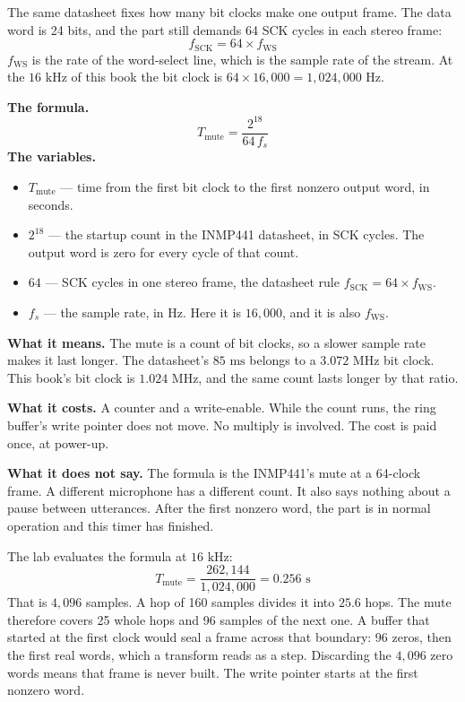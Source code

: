 \documentclass[11pt,a4paper]{article}
\begin{document}
The same datasheet fixes how many bit clocks make one output frame. The data word is 24 bits, and the part still demands 64 SCK cycles in each stereo frame:
\begin{equation*}
f_{\mathrm{SCK}} = 64 \times f_{\mathrm{WS}}
\end{equation*}
$f_{\mathrm{WS}}$ is the rate of the word-select line, which is the sample rate of the stream. At the $16\text{ kHz}$ of this book the bit clock is $64 \times 16{,}000 = 1{,}024{,}000\text{ Hz}$.

\begin{equationcard}
\textbf{The formula.}
\[
T_{\mathrm{mute}} = \frac{2^{18}}{64\, f_s}
\]
\textbf{The variables.}
\begin{itemize}\setlength{\itemsep}{1pt}
    \item $T_{\mathrm{mute}}$ --- time from the first bit clock to the first nonzero output word, in seconds.
    \item $2^{18}$ --- the startup count in the INMP441 datasheet, in SCK cycles. The output word is zero for every cycle of that count.
    \item $64$ --- SCK cycles in one stereo frame, the datasheet rule $f_{\mathrm{SCK}} = 64 \times f_{\mathrm{WS}}$.
    \item $f_s$ --- the sample rate, in Hz. Here it is $16{,}000$, and it is also $f_{\mathrm{WS}}$.
\end{itemize}
\textbf{What it means.} The mute is a count of bit clocks, so a slower sample rate makes it last longer. The datasheet's $85\text{ ms}$ belongs to a $3.072\text{ MHz}$ bit clock. This book's bit clock is $1.024\text{ MHz}$, and the same count lasts longer by that ratio.

\textbf{What it costs.} A counter and a write-enable. While the count runs, the ring buffer's write pointer does not move. No multiply is involved. The cost is paid once, at power-up.

\textbf{What it does not say.} The formula is the INMP441's mute at a 64-clock frame. A different microphone has a different count. It also says nothing about a pause between utterances. After the first nonzero word, the part is in normal operation and this timer has finished.
\end{equationcard}

The lab evaluates the formula at $16\text{ kHz}$:
\[
T_{\mathrm{mute}} = \frac{262{,}144}{1{,}024{,}000} = 0.256\text{ s}
\]
That is $4{,}096$ samples. A hop of 160 samples divides it into $25.6$ hops. The mute therefore covers 25 whole hops and 96 samples of the next one. A buffer that started at the first clock would seal a frame across that boundary: 96 zeros, then the first real words, which a transform reads as a step. Discarding the $4{,}096$ zero words means that frame is never built. The write pointer starts at the first nonzero word.
\end{document}
